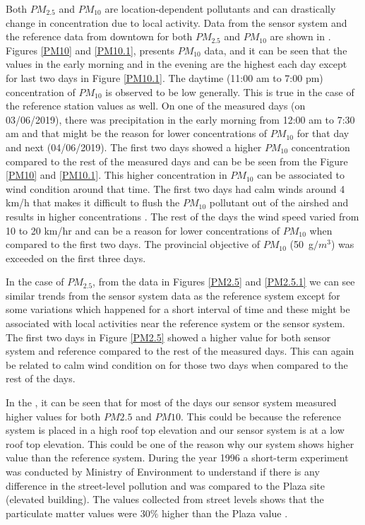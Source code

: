 Both $PM_{2.5}$ and $PM_{10}$ are location-dependent pollutants and can drastically change in concentration due to local activity. Data from the sensor system and the reference data from downtown for both $PM_{2.5}$ and $PM_{10}$ are shown in . Figures \ref{PM10} and \ref{PM10.1}, presents $PM_{10}$ data, and it can be seen that the values in the early morning and in the evening are the highest each day except for last two days in Figure \ref{PM10.1}. The daytime (11:00 am to 7:00 pm) concentration of $PM_{10}$ is observed to be low generally. This is true in the case of the reference station values as well. On one of the measured days (on 03/06/2019), there was precipitation in the early morning from 12:00 am to 7:30 am and that might be the reason for lower concentrations of $PM_{10}$ for that day and next (04/06/2019). The first two days showed a higher $PM_{10}$ concentration compared to the rest of the measured days and can be be seen from the Figure \ref{PM10} and \ref{PM10.1}. This higher concentration in $PM_{10}$ can be associated to wind condition around that time. The first two days had calm winds around 4 km/h that makes it difficult to flush the $PM_{10}$ pollutant out of the airshed and results in higher concentrations \cite{EnvironmentalQualitySectionMoE2012}. The rest of the days the wind speed varied from 10 to 20 km/hr and can be a reason for lower concentrations of $PM_{10}$ when compared to the first two days. The provincial objective of $PM_{10}$ (50~{\textmu}g$/m^3$) was exceeded on the first three days.


In the case of $PM_{2.5}$,  from the data in Figures \ref{PM2.5} and \ref{PM2.5.1} we can see similar trends from the sensor system data as the reference system except for some variations which happened for a short interval of time and these might be associated with local activities near the reference system or the sensor system. The first two days in Figure \ref{PM2.5} showed a higher value for both sensor system and reference compared to the rest of the measured days. This can again be related to calm wind condition on for those two days when compared to the rest of the days. 


In the , it can be seen that for most of the days our sensor system measured higher values for both $PM2.5$ and $PM10$. This could be because the reference system is placed in a high roof top elevation and our sensor system is at a low roof top elevation. This could be one of the reason why our system shows higher value than the reference system. During the year 1996 a short-term experiment was conducted by Ministry of Environment to understand if there is any difference in the street-level pollution and was compared to the Plaza site (elevated building). The values collected from street levels shows that the particulate matter values were 30$\%$ higher than the Plaza value \cite{Environment2010}.


